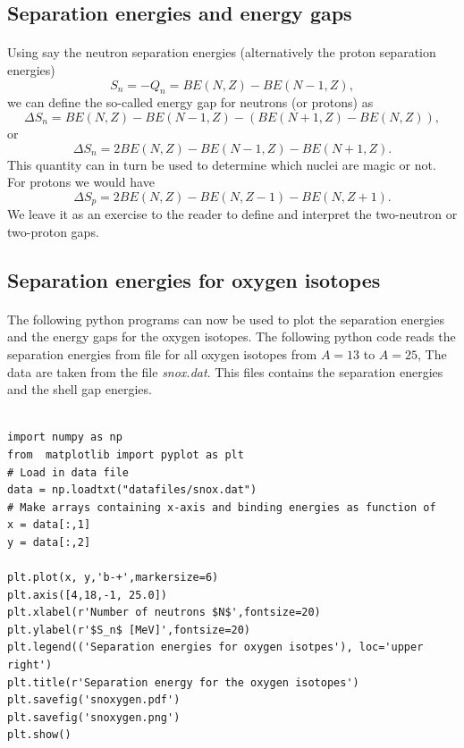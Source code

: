 \documentclass[%
twoside,                 %
final,                   %
10pt]{article}
\begin{document}
\subsection*{Separation energies and energy gaps}

\paragraph{}
Using say the neutron separation energies (alternatively the proton separation energies)
\[
S_n= -Q_n= BE(N,Z)-BE(N-1,Z),
\]
we can define the so-called energy gap for neutrons (or protons) as 
\[
\Delta S_n= BE(N,Z)-BE(N-1,Z)-\left(BE(N+1,Z)-BE(N,Z)\right),
\]
or 
\[
\Delta S_n= 2BE(N,Z)-BE(N-1,Z)-BE(N+1,Z).
\]
This quantity can in turn be used to determine which nuclei are magic or not. 
For protons we would have 
\[
\Delta S_p= 2BE(N,Z)-BE(N,Z-1)-BE(N,Z+1).
\]
We leave it as an exercise to the reader to define and interpret the two-neutron or two-proton gaps.




\subsection*{Separation energies for oxygen isotopes}

\paragraph{}
The following python programs can now be used to plot the separation energies and the energy gaps for the oxygen isotopes.  The following python code reads the separation energies from file for all oxygen isotopes from $A=13$ to $A=25$, The data are taken from the file \emph{snox.dat}.  This files contains the separation energies and the shell gap energies.
\begin{verbatim}

import numpy as np
from  matplotlib import pyplot as plt
# Load in data file
data = np.loadtxt("datafiles/snox.dat")
# Make arrays containing x-axis and binding energies as function of
x = data[:,1]
y = data[:,2]

plt.plot(x, y,'b-+',markersize=6)
plt.axis([4,18,-1, 25.0])
plt.xlabel(r'Number of neutrons $N$',fontsize=20)
plt.ylabel(r'$S_n$ [MeV]',fontsize=20)
plt.legend(('Separation energies for oxygen isotpes'), loc='upper right')
plt.title(r'Separation energy for the oxygen isotopes')
plt.savefig('snoxygen.pdf')
plt.savefig('snoxygen.png')
plt.show()
\end{verbatim}
\end{document}
